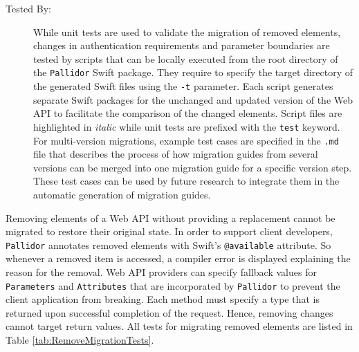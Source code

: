 \begin{description}
	\item[Tested By:] While unit tests are used to validate the migration of removed elements, changes in authentication requirements and parameter boundaries are tested by scripts that can be locally executed from the root directory of the \texttt{Pallidor} Swift package. They require to specify the target directory of the generated Swift files using the \texttt{-t} parameter. Each script generates separate Swift packages for the unchanged and updated version of the Web API to facilitate the comparison of the changed elements. Script files are highlighted in \textit{italic} while unit tests are prefixed with the \texttt{test} keyword. For multi-version migrations, example test cases are specified in the \texttt{.md} file that describes the process of how migration guides from several versions can be merged into one migration guide for a specific version step. These test cases can be used by future research to integrate them in the automatic generation of migration guides.
\end{description}
\vspace{4em}
Removing elements of a Web API without providing a replacement cannot be migrated to restore their original state. In order to support client developers, \texttt{Pallidor} annotates removed elements with Swift's \texttt{@available} attribute. So whenever a removed item is accessed, a compiler error is displayed explaining the reason for the removal. Web API providers can specify fallback values for \texttt{Parameters} and \texttt{Attributes} that are incorporated by \texttt{Pallidor} to prevent the client application from breaking. Each method must specify a type that is returned upon successful completion of the request. Hence, removing changes cannot target return values. All tests for migrating removed elements are listed in Table \ref{tab:RemoveMigrationTests}.


